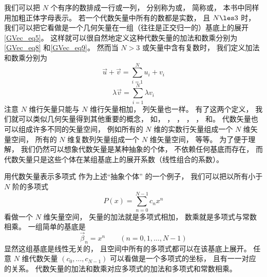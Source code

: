 

我们可以把 $N$ 个有序的数排成一行或一列， 分别称为或， 简称或， 本书中同样用加粗正体字母表示。 若一个代数矢量中所有的数都是实数， 且 $N \les 3$%
时， 我们可以把它看做是一个几何矢量在一组（往往是正交归一的）基底上的展开\autoref{GVec_eq5}。 这样就可以很自然地定义这种代数矢量的加法和数乘分别为\autoref{GVec_eq8} 和\autoref{GVec_eq9}。 然而当 $N > 3$ 或矢量中含有复数时， 我们定义加法和数乘分别为
\begin{equation}
\vec u + \vec v = \sum_{i = 1}^N u_i + v_i
\end{equation}
\begin{equation}
\lambda \vec v = \sum_{i = 1}^N \lambda v_i
\end{equation}
注意 $N$ 维行矢量只能与 $N$ 维行矢量相加， 列矢量也一样。 有了这两个定义， 我们就可以类似几何矢量得到其他重要的概念， 如， ， ， ， ， 和。 代数矢量也可以组成许多不同的矢量空间， 例如所有的 $N$ 维的实数行矢量组成一个 $N$ 维矢量空间， 所有的 $N$ 维复数列矢量组成一个 $N$ 维矢量空间， 等等。 为了便于理解， 我们仍然可以想象代数矢量是某种抽象的个体， 不依赖任何基底而存在， 而代数矢量只是这些个体在某组基底上的展开系数（线性组合的系数）。

\begin{exam}{用代数矢量表示多项式}
作为上述“抽象个体” 的一个例子， 我们可以把以所有小于 $N$ 阶的多项式
\begin{equation}
P(x) = \sum_{n = 0}^{N-1} c_n x^n
\end{equation}
看做一个 $N$ 维矢量空间， 矢量的加法就是多项式相加， 数乘就是多项式与常数相乘。 一组简单的基底是
\begin{equation}
\vec \beta_n = x^n \qquad (n = 0, 1, \dots, N-1)
\end{equation}
显然这组基底是线性无关的， 且空间中所有的多项式都可以在该基底上展开。 任意 $N$ 维代数矢量 $(c_0, \dots, c_{N-1})$ 可以看做是一个多项式的坐标， 且有一一对应的关系。 代数矢量的加法和数乘对应多项式的加法和多项式和常数相乘。
\end{exam}

